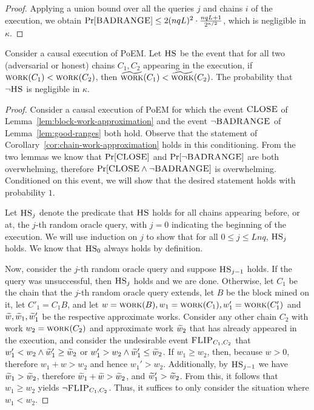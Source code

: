 \begin{proof}
  Applying a union bound over all the queries $j$ and chains $i$ of the execution, we obtain
  $\Pr[\textsc{BADRANGE}] \leq 2 (nqL)^2 \cdot \frac{nqL + 1}{2^{\kappa/2}}$, which is negligible in $\kappa$.
  \Qed
\end{proof}

\begin{lemma}\label{lem:hash-separation}
  Consider a causal execution of PoEM. Let $\textsc{HS}$ be the event that for
  all two (adversarial or honest) chains
  $C_1, C_2$ appearing in the execution, if
  $\textsc{work}(C_1) < \textsc{work}(C_2)$, then $\widetilde{\textsc{work}}(C_1) < \widetilde{\textsc{work}}(C_2)$.
  The probability that $\lnot \textsc{HS}$ is negligible in $\kappa$.
\end{lemma}
\begin{proof}
  Consider a causal execution of PoEM for which
  the event $\textsc{CLOSE}$ of Lemma~\ref{lem:block-work-approximation}
  and the event $\lnot \textsc{BADRANGE}$ of Lemma~\ref{lem:good-ranges}
  both hold.
  Observe that the statement of Corollary~\ref{cor:chain-work-approximation}
  holds in this conditioning.
  From the two lemmas we know that $\Pr[\textsc{CLOSE}]$ and
  $\Pr[\lnot \textsc{BADRANGE}]$ are both overwhelming, therefore
  $\Pr[\textsc{CLOSE} \land \lnot \textsc{BADRANGE}]$ is overwhelming.
  Conditioned on this event, we will
  show that the desired statement holds with probability $1$.

  Let $\textsc{HS}_j$ denote the predicate that $\textsc{HS}$ holds for all chains appearing
  before, or at, the $j$-th random oracle query, with $j = 0$ indicating
  the beginning of the execution.
  We will use induction on $j$ to show that for all $0 \leq j \leq Lnq$,
  $\textsc{HS}_j$ holds. We know that $\textsc{HS}_0$ always holds by definition.

  Now, consider the $j$-th random oracle query and suppose $\textsc{HS}_{j - 1}$ holds.
  If the query was unsuccessful, then $\textsc{HS}_j$ holds and we are done.
  Otherwise, let $C_1$ be the chain
  that the $j$-th random oracle query extends, let $B$ be the block mined on it,
  let $C'_1 = C_1 B$, and let $w = \textsc{work}(B), w_1 = \textsc{work}(C_1), w'_1 = \textsc{work}(C'_1)$
  and $\widetilde{w}, \widetilde{w}_1, \widetilde{w}'_1$ be the respective approximate works.
  Consider any other chain $C_2$ with work $w_2 = \textsc{work}(C_2)$
  and approximate work $\widetilde{w}_2$
  that has already appeared in the execution,
  and consider the undesirable event $\textsc{FLIP}_{C_1,C_2}$ that
  $w'_1 < w_2 \land \widetilde{w}'_1 \geq \widetilde{w}_2$ or $w'_1 > w_2 \land \widetilde{w}'_1 \leq \widetilde{w}_2$.
  If $w_1 \geq w_2$, then, because $w > 0$, therefore $w_1 + w > w_2$ and hence $w_1' > w_2$.
  Additionally, by $\textsc{HS}_{j - 1}$ we have $\widetilde{w}_1 > \widetilde{w}_2$, therefore $\widetilde{w}_1 + \widetilde{w} > \widetilde{w}_2$, and
  $\widetilde{w}_1' > \widetilde{w}_2$. From this, it follows that $w_1 \geq w_2$ yields $\lnot \textsc{FLIP}_{C_1,C_2}$.
  Thus, it suffices to only consider the situation where $w_1 < w_2$.


\end{proof}
